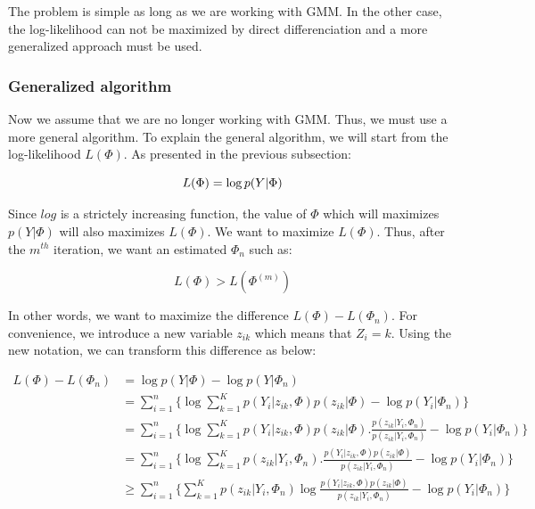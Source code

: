 The problem is simple as long as we are working with GMM. In the other case, the log-likelihood can not be maximized by direct differenciation and a more generalized approach must be used.
%
\subsubsection{Generalized algorithm}\label{GENERAL}
Now we assume that we are no longer working with GMM. Thus, we must use a more general algorithm. %
To explain the general algorithm, we will start from the log-likelihood $L(\Phi)$. As presented in the previous subsection:

  \begin{equation*}
  L(\Phi)=\operatorname*{log} p(Y|\Phi)\\
  \end{equation*}
 
Since $log$ is a strictely increasing function, the value of $\Phi$ which will maximizes  $p(Y|\Phi)$ will also maximizes $L(\Phi)$. We want to maximize $L(\Phi)$. Thus, after the $m^{th}$ iteration, we want an estimated $\Phi_n$ such as:

  \begin{equation*}
  L(\Phi)>L(\Phi^{(m)})
  \end{equation*}
 
In other words, we want to maximize the difference $L(\Phi)-L(\Phi_n)$. For convenience, we introduce a new variable $z_{ik}$ which means that $Z_i=k$. Using the new notation, we can transform this difference as below:

 
  \begin{align*}
  L(\Phi)-L(\Phi_n) &=\operatorname*{log} p(Y|\Phi) -\operatorname*{log} p(Y|\Phi_n)\\
                    &=\sum_{i=1}^n\{\operatorname*{log} \sum_{k=1}^K p(Y_i|z_{ik},\Phi)p(z_{ik}|\Phi)-\operatorname*{log} p(Y_i|\Phi_n)\}\\
                    &=\sum_{i=1}^n\{\operatorname*{log} \sum_{k=1}^K p(Y_i|z_{ik},\Phi)p(z_{ik}|\Phi).\frac{p(z_{ik}|Y_i,\Phi_n)}{p(z_{ik}|Y_i,\Phi_n)}-\operatorname*{log} p(Y_i|\Phi_n)\}\\
                    &=\sum_{i=1}^n\{\operatorname*{log} \sum_{k=1}^K p(z_{ik}|Y_i,\Phi_n).\frac{p(Y_i|z_{ik},\Phi)p(z_{ik}|\Phi)}{p(z_{ik}|Y_i,\Phi_n)}-\operatorname*{log} p(Y_i|\Phi_n)\}\\
                    &\geq \sum_{i=1}^n\{\sum_{k=1}^K p(z_{ik}|Y_i,\Phi_n)\operatorname*{log} \frac{p(Y_i|z_{ik},\Phi)p(z_{ik}|\Phi)}{p(z_{ik}|Y_i,\Phi_n)}-\operatorname*{log} p(Y_i|\Phi_n)\}
  \end{align*}

